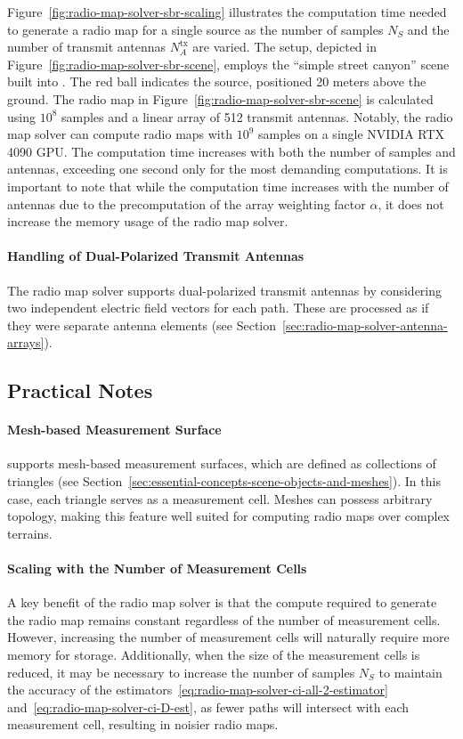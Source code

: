 Figure~\ref{fig:radio-map-solver-sbr-scaling} illustrates the computation time needed to generate a radio map for a single source as the number of samples $N_S$ and the number of transmit antennas $N_A^{\text{tx}}$ are varied. The setup, depicted in Figure~\ref{fig:radio-map-solver-sbr-scene}, employs the ``simple street canyon'' scene built into \SRT{}. The red ball indicates the source, positioned 20 meters above the ground. The radio map in Figure~\ref{fig:radio-map-solver-sbr-scene} is calculated using $10^8$ samples and a linear array of 512 transmit antennas. Notably, the radio map solver can compute radio maps with $10^9$ samples on a single NVIDIA RTX 4090 GPU.
The computation time increases with both the number of samples and antennas, exceeding one second only for the most demanding computations. It is important to note that while the computation time increases with the number of antennas due to the precomputation of the array weighting factor $\alpha$, it does not increase the memory usage of the radio map solver.

\paragraph{Handling of Dual-Polarized Transmit Antennas}

The radio map solver supports dual-polarized transmit antennas by considering two independent electric field vectors for each path. These are processed as if they were separate antenna elements (see Section~\ref{sec:radio-map-solver-antenna-arrays}).

\subsection{Practical Notes}

\paragraph{Mesh-based Measurement Surface}
\SRT{} supports mesh-based measurement surfaces, which are defined as collections of triangles (see Section~\ref{sec:essential-concepts-scene-objects-and-meshes}). In this case, each triangle serves as a measurement cell. Meshes can possess arbitrary topology, making this feature well suited for computing radio maps over complex terrains.

\paragraph{Scaling with the Number of Measurement Cells}
A key benefit of the radio map solver is that the compute required to generate the radio map remains constant regardless of the number of measurement cells. However, increasing the number of measurement cells will naturally require more memory for storage. Additionally, when the size of the measurement cells is reduced, it may be necessary to increase the number of samples $N_S$ to maintain the accuracy of the estimators~\eqref{eq:radio-map-solver-ci-all-2-estimator} and~\eqref{eq:radio-map-solver-ci-D-est}, as fewer paths will intersect with each measurement cell, resulting in noisier radio maps.


